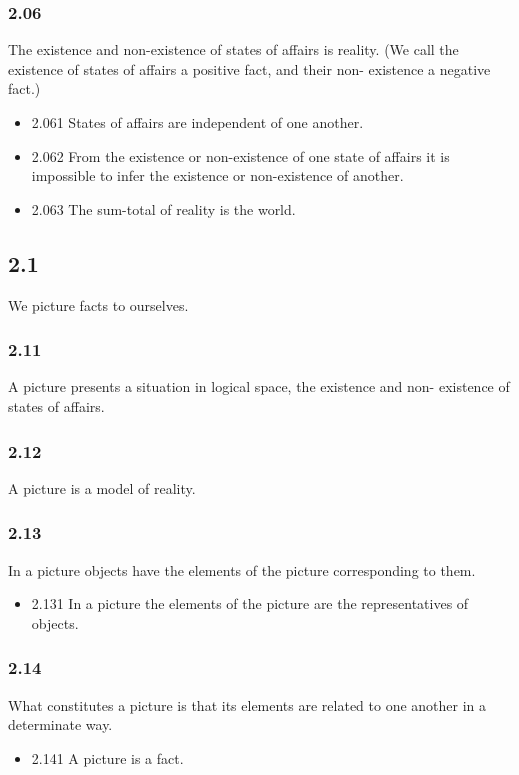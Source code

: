 \documentclass[11pt]{article}
\begin{document}
\subsubsection*{2.06}
\label{sec:org824095b}
The existence and non-existence of states of affairs is reality. (We
call the existence of states of affairs a positive fact, and their non-
existence a negative fact.)
\begin{itemize}
\item 2.061
\label{sec:orga5a10ac}
States of affairs are independent of one another.
\item 2.062
\label{sec:org7cf0eb3}
From the existence or non-existence of one state of affairs it is
impossible to infer the existence or non-existence of another.
\item 2.063
\label{sec:org06e18c4}
The sum-total of reality is the world.
\end{itemize}
\subsection*{2.1}
\label{sec:orgd0fe7e1}
We picture facts to ourselves.
\subsubsection*{2.11}
\label{sec:org65d0e3b}
A picture presents a situation in logical space, the existence and non-
existence of states of affairs.
\subsubsection*{2.12}
\label{sec:org57081dc}
A picture is a model of reality.
\subsubsection*{2.13}
\label{sec:org4cfd864}
In a picture objects have the elements of the picture corresponding to
them.
\begin{itemize}
\item 2.131
\label{sec:org538df39}
In a picture the elements of the picture are the representatives of
objects.
\end{itemize}
\subsubsection*{2.14}
\label{sec:orga5e691e}
What constitutes a picture is that its elements are related to one
another in a determinate way.
\begin{itemize}
\item 2.141
\label{sec:orgbdb8d9b}
A picture is a fact.
\end{itemize}
\end{document}
